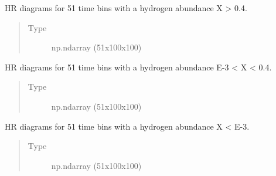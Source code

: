 \documentclass[letterpaper,10pt,english]{sphinxmanual}
\begin{document}
\begin{fulllineitems}
\begin{fulllineitems}
\end{fulllineitems}


\begin{fulllineitems}
\label{\detokenize{hrdiagrams:hoki.hrdiagrams.HRDiagram.self.high_H_not_weighted}}
HR diagrams for 51 time bins with a hydrogen abundance X \textgreater{} 0.4.
\begin{quote}\begin{description}
\item[{Type}] \leavevmode
np.ndarray (51x100x100)

\end{description}\end{quote}

\end{fulllineitems}


\begin{fulllineitems}
\label{\detokenize{hrdiagrams:hoki.hrdiagrams.HRDiagram.self.medium_H_not_weighted}}
HR diagrams for 51 time bins with a hydrogen abundance E-3 \textless{} X \textless{} 0.4.
\begin{quote}\begin{description}
\item[{Type}] \leavevmode
np.ndarray (51x100x100)

\end{description}\end{quote}

\end{fulllineitems}


\begin{fulllineitems}
\label{\detokenize{hrdiagrams:hoki.hrdiagrams.HRDiagram.self.low_H_not_weighted}}
HR diagrams for 51 time bins with a hydrogen abundance X \textless{} E-3.
\begin{quote}\begin{description}
\item[{Type}] \leavevmode
np.ndarray (51x100x100)


\end{description}
\end{quote}
\end{fulllineitems}
\end{fulllineitems}
\end{document}
